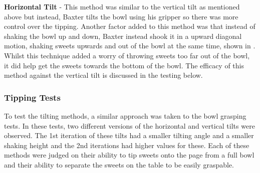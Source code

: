\newline\newline
\textbf{Horizontal Tilt} - This method was similar to the vertical tilt as mentioned above but instead, Baxter tilts the bowl using his gripper so there was more control over the tipping. Another factor added to this method was that instead of shaking the bowl up and down, Baxter instead shook it in a upward diagonal motion, shaking sweets upwards and out of the bowl at the same time, shown in \textbf{}. Whilst this technique added a worry of throwing sweets too far out of the bowl, it did help get the sweets towards the bottom of the bowl. The efficacy of this method against the vertical tilt is discussed in the testing below.
\subsubsection{Tipping Tests}
\label{sssec:TippingTest}
To test the tilting methods, a similar approach was taken to the bowl grasping tests. In these tests, two different versions of the horizontal and vertical tilts were observed. The 1st iteration of these tilts had a smaller tilting angle and a smaller shaking height and the 2nd iterations had higher values for these. Each of these methods were judged on their ability to tip sweets onto the page from a full bowl and their ability to separate the sweets on the table to be easily graspable.
